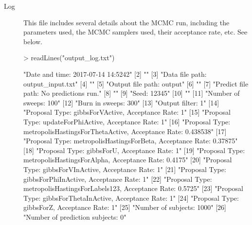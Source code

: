 \documentclass{article}
\begin{document}
\begin{description}
\item[Log] This file includes several details about the MCMC run, including the parameters used, the MCMC samplers used, their acceptance rate, etc. See below. 

\begin{Schunk}
\begin{Sinput}
> readLines("output_log.txt")
\end{Sinput}
\begin{Soutput}
 [1] "Date and time: 2017-07-14 14:5242"                                         
 [2] ""                                                                          
 [3] "Data file path: output_input.txt"                                          
 [4] ""                                                                          
 [5] "Output file path: output"                                                  
 [6] ""                                                                          
 [7] "Predict file path: No predictions run."                                    
 [8] ""                                                                          
 [9] "Seed: 12345"                                                               
[10] ""                                                                          
[11] "Number of sweeps: 100"                                                     
[12] "Burn in sweeps: 300"                                                       
[13] "Output filter: 1"                                                          
[14] "Proposal Type: gibbsForVActive, Acceptance Rate: 1"                        
[15] "Proposal Type: updateForPhiActive, Acceptance Rate: 1"                     
[16] "Proposal Type: metropolisHastingsForThetaActive, Acceptance Rate: 0.438538"
[17] "Proposal Type: metropolisHastingsForBeta, Acceptance Rate: 0.37875"        
[18] "Proposal Type: gibbsForU, Acceptance Rate: 1"                              
[19] "Proposal Type: metropolisHastingsForAlpha, Acceptance Rate: 0.4175"        
[20] "Proposal Type: gibbsForVInActive, Acceptance Rate: 1"                      
[21] "Proposal Type: gibbsForPhiInActive, Acceptance Rate: 1"                    
[22] "Proposal Type: metropolisHastingsForLabels123, Acceptance Rate: 0.5725"    
[23] "Proposal Type: gibbsForThetaInActive, Acceptance Rate: 1"                  
[24] "Proposal Type: gibbsForZ, Acceptance Rate: 1"                              
[25] "Number of subjects: 1000"                                                  
[26] "Number of prediction subjects: 0"                                          

\end{Soutput}
\end{Schunk}
\end{description}
\end{document}
